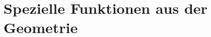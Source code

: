 %
%
%
\chapter{Spezielle Funktionen aus der Geometrie
\label{buch:chapter:geometrie}}
\rhead{}






